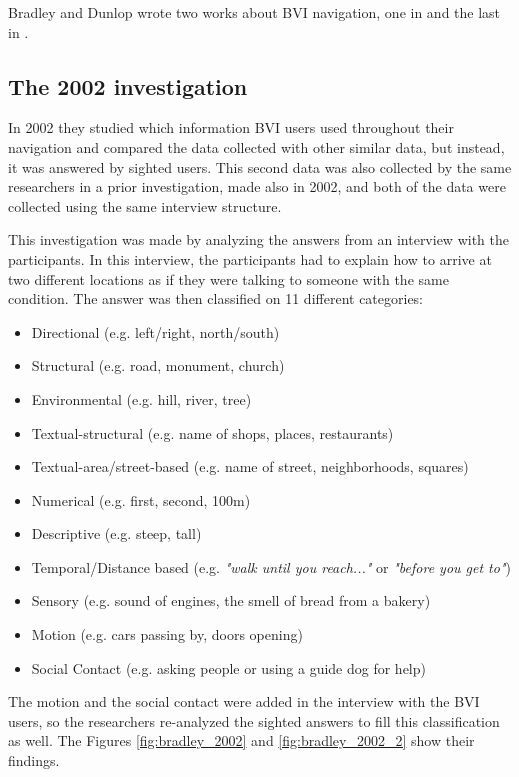 Bradley and Dunlop wrote two works about BVI navigation, one in \citeyear{bradley2002investigating} and the last in \citeyear{bradley2005experimental}. 

\subsection{The 2002 investigation}

In 2002 they studied which information BVI users used throughout their navigation and compared the data collected with other similar data, but instead, it was answered by sighted users. This second data was also collected by the same researchers in a prior investigation, made also in 2002, and both of the data were collected using the same interview structure.

This investigation was made by analyzing the answers from an interview with the participants. In this interview, the participants had to explain how to arrive at two different locations as if they were talking to someone with the same condition. The answer was then classified on 11 different categories:

\begin{itemize}
    \item Directional (e.g. left/right, north/south)
    \item Structural (e.g. road, monument, church)
    \item Environmental (e.g. hill, river, tree)
    \item Textual-structural (e.g. name of shops, places, restaurants)
    \item Textual-area/street-based (e.g. name of street, neighborhoods, squares)
    \item Numerical (e.g. first, second, 100m)
    \item Descriptive (e.g. steep, tall)
    \item Temporal/Distance based (e.g. \textit{"walk until you reach..."} or \textit{"before you get to"})
    \item Sensory (e.g. sound of engines, the smell of bread from a bakery)
    \item Motion (e.g. cars passing by, doors opening)
    \item Social Contact (e.g. asking people or using a guide dog for help)
\end{itemize}

The motion and the social contact were added in the interview with the BVI users, so the researchers re-analyzed the sighted answers to fill this classification as well. The Figures \ref{fig:bradley_2002} and \ref{fig:bradley_2002_2} show their findings.

